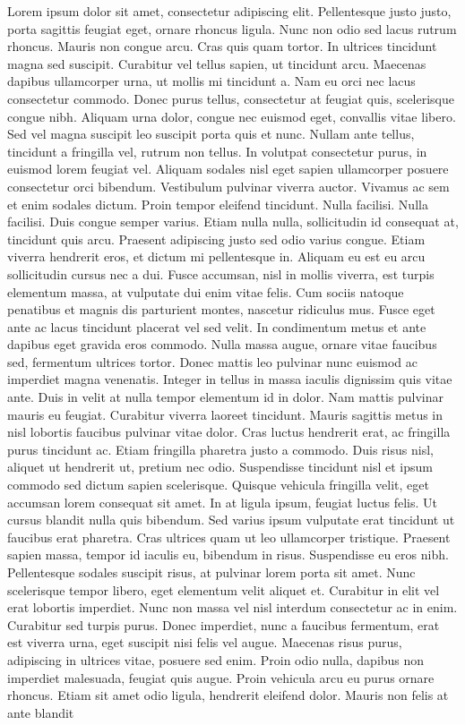 \documentclass[letterpaper, twoside, 12pt, memoire, creativecommons, hyperref]{thETS}
\begin{document}
\begin{introduction}

Lorem ipsum dolor sit amet, consectetur adipiscing elit. Pellentesque justo justo, porta sagittis feugiat eget, ornare rhoncus ligula. Nunc non odio sed lacus rutrum rhoncus. Mauris non congue arcu. Cras quis quam tortor.  In ultrices tincidunt magna sed suscipit. Curabitur vel tellus sapien, ut tincidunt arcu. Maecenas dapibus ullamcorper urna, ut mollis mi tincidunt a. Nam eu orci nec lacus consectetur commodo. Donec purus tellus, consectetur at feugiat quis, scelerisque congue nibh. Aliquam urna dolor, congue nec euismod eget, convallis vitae libero. Sed vel magna suscipit leo suscipit porta quis et nunc. Nullam ante tellus, tincidunt a fringilla vel, rutrum non tellus. In volutpat consectetur purus, in euismod lorem feugiat vel. Aliquam sodales nisl eget sapien ullamcorper posuere consectetur orci bibendum. Vestibulum pulvinar viverra auctor. Vivamus ac sem et enim sodales dictum. Proin tempor eleifend tincidunt. Nulla facilisi. Nulla facilisi. Duis congue semper varius. Etiam nulla nulla, sollicitudin id consequat at, tincidunt quis arcu. Praesent adipiscing justo sed odio varius congue. Etiam viverra hendrerit eros, et dictum mi pellentesque in. Aliquam eu est eu arcu sollicitudin cursus nec a dui. Fusce accumsan, nisl in mollis viverra, est turpis elementum massa, at vulputate dui enim vitae felis. Cum sociis natoque penatibus et magnis dis parturient montes, nascetur ridiculus mus. Fusce eget ante ac lacus tincidunt placerat vel sed velit. In condimentum metus et ante dapibus eget gravida eros commodo. Nulla massa augue, ornare vitae faucibus sed, fermentum ultrices tortor. Donec mattis leo pulvinar nunc euismod ac imperdiet magna venenatis. Integer in tellus in massa iaculis dignissim quis vitae ante. Duis in velit at nulla tempor elementum id in dolor. Nam mattis pulvinar mauris eu feugiat. Curabitur viverra laoreet tincidunt. Mauris sagittis metus in nisl lobortis faucibus pulvinar vitae dolor. Cras luctus hendrerit erat, ac fringilla purus tincidunt ac. Etiam fringilla pharetra justo a commodo. Duis risus nisl, aliquet ut hendrerit ut, pretium nec odio. Suspendisse tincidunt nisl et ipsum commodo sed dictum sapien scelerisque. Quisque vehicula fringilla velit, eget accumsan lorem consequat sit amet. In at ligula ipsum, feugiat luctus felis. Ut cursus blandit nulla quis bibendum. Sed varius ipsum vulputate erat tincidunt ut faucibus erat pharetra. Cras ultrices quam ut leo ullamcorper tristique. Praesent sapien massa, tempor id iaculis eu, bibendum in risus. Suspendisse eu eros nibh. Pellentesque sodales suscipit risus, at pulvinar lorem porta sit amet. Nunc scelerisque tempor libero, eget elementum velit aliquet et. Curabitur in elit vel erat lobortis imperdiet. Nunc non massa vel nisl interdum consectetur ac in enim. Curabitur sed turpis purus. Donec imperdiet, nunc a faucibus fermentum, erat est viverra urna, eget suscipit nisi felis vel augue. Maecenas risus purus, adipiscing in ultrices vitae, posuere sed enim. Proin odio nulla, dapibus non imperdiet malesuada, feugiat quis augue. Proin vehicula arcu eu purus ornare rhoncus. Etiam sit amet odio ligula, hendrerit eleifend dolor. Mauris non felis at ante blandit 
\end{introduction}
\end{document}
